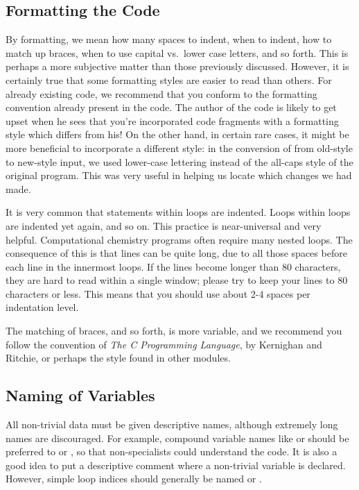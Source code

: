 \subsection{Formatting the Code}
By formatting, we mean how many spaces to indent, when to indent, how
to match up braces, when to use capital vs.~lower case letters, and so
forth.  This is perhaps a more subjective matter than those previously
discussed.  However, it is certainly true that some formatting styles
are easier to read than others.  For already existing code, we
recommend that you conform to the formatting convention already
present in the code.  The author of the code is likely to get upset
when he sees that you're incorporated code fragments with a formatting
style which differs from his!  On the other hand, in certain rare
cases, it might be more beneficial to incorporate a different style:
in the conversion of  from old-style to new-style
input, we used lower-case lettering instead of the all-caps style of
the original program.  This was very useful in helping us locate which
changes we had made.

It is very common that statements within loops are indented.  Loops
within loops are indented yet again, and so on.  This practice is
near-universal and very helpful.  Computational chemistry programs
often require many nested loops.  The consequence of this is that
lines can be quite long, due to all those spaces before each line in
the innermost loops.  If the lines become longer than 80 characters,
they are hard to read within a single window; please try to keep your
lines to 80 characters or less.  This means that you should use about
2-4 spaces per indentation level.

The matching of braces, and so forth, is more variable, and we
recommend you follow the convention of {\em The C Programming
Language}, by Kernighan and Ritchie, or perhaps the style found in
other \PSIthree modules.

\subsection{Naming of Variables}
All non-trivial data must be given descriptive names, although
extremely long names are discouraged. For example, compound variable
names like  or  should be
preferred to  or , so that non-specialists
could understand the code.  It is also a good idea to put a
descriptive comment where a non-trivial variable is declared. However,
simple loop indices should generally be named  or
.

